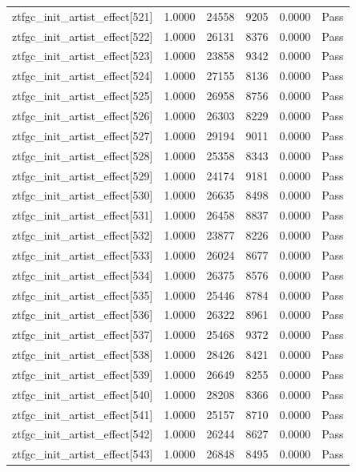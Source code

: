 \begin{table}[htbp]
\begin{tabular}{llrrll}
ztfgc\_init\_artist\_effect[521] & 1.0000 & 24558 & 9205 & 0.0000 & Pass \\
ztfgc\_init\_artist\_effect[522] & 1.0000 & 26131 & 8376 & 0.0000 & Pass \\
ztfgc\_init\_artist\_effect[523] & 1.0000 & 23858 & 9342 & 0.0000 & Pass \\
ztfgc\_init\_artist\_effect[524] & 1.0000 & 27155 & 8136 & 0.0000 & Pass \\
ztfgc\_init\_artist\_effect[525] & 1.0000 & 26958 & 8756 & 0.0000 & Pass \\
ztfgc\_init\_artist\_effect[526] & 1.0000 & 26303 & 8229 & 0.0000 & Pass \\
ztfgc\_init\_artist\_effect[527] & 1.0000 & 29194 & 9011 & 0.0000 & Pass \\
ztfgc\_init\_artist\_effect[528] & 1.0000 & 25358 & 8343 & 0.0000 & Pass \\
ztfgc\_init\_artist\_effect[529] & 1.0000 & 24174 & 9181 & 0.0000 & Pass \\
ztfgc\_init\_artist\_effect[530] & 1.0000 & 26635 & 8498 & 0.0000 & Pass \\
ztfgc\_init\_artist\_effect[531] & 1.0000 & 26458 & 8837 & 0.0000 & Pass \\
ztfgc\_init\_artist\_effect[532] & 1.0000 & 23877 & 8226 & 0.0000 & Pass \\
ztfgc\_init\_artist\_effect[533] & 1.0000 & 26024 & 8677 & 0.0000 & Pass \\
ztfgc\_init\_artist\_effect[534] & 1.0000 & 26375 & 8576 & 0.0000 & Pass \\
ztfgc\_init\_artist\_effect[535] & 1.0000 & 25446 & 8784 & 0.0000 & Pass \\
ztfgc\_init\_artist\_effect[536] & 1.0000 & 26322 & 8961 & 0.0000 & Pass \\
ztfgc\_init\_artist\_effect[537] & 1.0000 & 25468 & 9372 & 0.0000 & Pass \\
ztfgc\_init\_artist\_effect[538] & 1.0000 & 28426 & 8421 & 0.0000 & Pass \\
ztfgc\_init\_artist\_effect[539] & 1.0000 & 26649 & 8255 & 0.0000 & Pass \\
ztfgc\_init\_artist\_effect[540] & 1.0000 & 28208 & 8366 & 0.0000 & Pass \\
ztfgc\_init\_artist\_effect[541] & 1.0000 & 25157 & 8710 & 0.0000 & Pass \\
ztfgc\_init\_artist\_effect[542] & 1.0000 & 26244 & 8627 & 0.0000 & Pass \\
ztfgc\_init\_artist\_effect[543] & 1.0000 & 26848 & 8495 & 0.0000 & Pass \\

\end{tabular}
\end{table}

